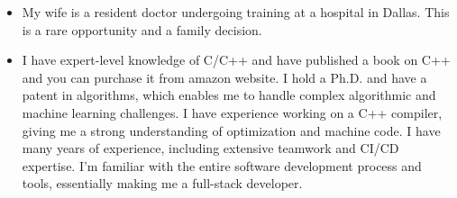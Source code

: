 \documentclass[a4paper,11pt,twoside]{book}
\begin{document}
\begin{itemize}
	\item My wife is a resident doctor undergoing training at a hospital in Dallas. This is a rare opportunity and a family decision.
	
	\item I have expert-level knowledge of C/C++ and have published a book on C++ and you can purchase it from amazon website. I hold a Ph.D. and have a patent in algorithms, which enables me to handle complex algorithmic and machine learning challenges. I have experience working on a C++ compiler, giving me a strong understanding of optimization and machine code. I have many years of experience, including extensive teamwork and CI/CD expertise. I’m familiar with the entire software development process and tools, essentially making me a full-stack developer. 
	
	
\end{itemize}



\ifx \allfiles \undefined
\end{document}
